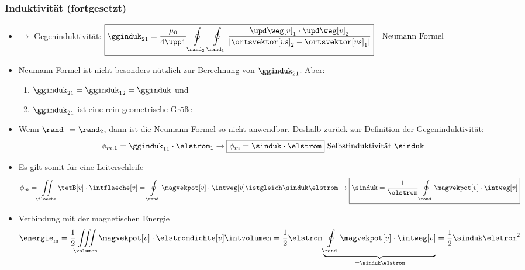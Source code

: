 \begin{frame}
  \frametitle{Induktivität (fortgesetzt)}
\begin{itemize}[<+->]
\item $\to$ Gegeninduktivität:
$\boxed{\gginduk_{21} = \dfrac{\mu_0}{4 \uppi}  \oint\limits_{\rand_2} \oint\limits_{\rand_1} \dfrac{\upd \weg[v]_1 \cdot \upd\weg[v]_2}{\left| \ortsvektor[vs]_2 - \ortsvektor[vs]_1 \right|} } \quad\text{Neumann Formel}$
\item Neumann-Formel ist nicht besonders nützlich zur Berechnung von \(\gginduk_{21} \). Aber:
\begin{enumerate}
	\item \(\gginduk_{21} = \gginduk_{12} = \gginduk \) und
	\item \(\gginduk_{21} \) ist eine rein geometrische Größe
\end{enumerate}
\item Wenn \(\rand_1 = \rand_2 \), dann ist die Neumann-Formel so nicht anwendbar. Deshalb zurück zur Definition der Gegeninduktivität:
\begin{equation*}
	\phi_{m,1} = \gginduk_{11} \cdot \elstrom_1 \to \boxed{\phi_{m} = \sinduk \cdot \elstrom } \text{ Selbstinduktivität } \sinduk 
\end{equation*}
\item  Es gilt somit für eine Leiterschleife
\begin{equation*}
	\phi_m = \iint\limits_{\flaeche} \tetB[v] \cdot \intflaeche[v] = \oint\limits_{\rand} \magvekpot[v] \cdot \intweg[v] \istgleich \sinduk \elstrom \to 	\boxed{\sinduk = \dfrac{1}{\elstrom}\oint\limits_{\rand} \magvekpot[v] \cdot \intweg[v]}
      \end{equation*}
\item Verbindung mit der magnetischen Energie 
\begin{equation*}
	\energie_\mathrm{m} = \dfrac{1}{2}  \iiint\limits_{\volumen} \magvekpot[v] \cdot \elstromdichte[v] \intvolumen
= \dfrac{1}{2} \elstrom \underbrace{\oint\limits_{\rand} \magvekpot[v] \cdot \intweg[v]}_{=\sinduk \elstrom} = \dfrac{1}{2} \sinduk \elstrom^2 
\end{equation*}
\end{itemize}
\end{frame}

